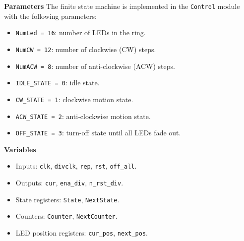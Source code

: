 \noindent\textbf{Parameters}
The finite state machine is implemented in the \texttt{Control} module with the following parameters:
\begin{itemize}
	\item \texttt{NumLed = 16}: number of LEDs in the ring.
	\item \texttt{NumCW = 12}: number of clockwise (CW) steps.
	\item \texttt{NumACW = 8}: number of anti-clockwise (ACW) steps.
	\item \texttt{IDLE\_STATE = 0}: idle state.
	\item \texttt{CW\_STATE = 1}: clockwise motion state.
	\item \texttt{ACW\_STATE = 2}: anti-clockwise motion state.
	\item \texttt{OFF\_STATE = 3}: turn-off state until all LEDs fade out.
\end{itemize}

\noindent\textbf{Variables}
\begin{itemize}
	\item Inputs: \texttt{clk}, \texttt{divclk}, \texttt{rep}, \texttt{rst}, \texttt{off\_all}.
	\item Outputs: \texttt{cur}, \texttt{ena\_div}, \texttt{n\_rst\_div}.
	\item State registers: \texttt{State}, \texttt{NextState}.
	\item Counters: \texttt{Counter}, \texttt{NextCounter}.
	\item LED position registers: \texttt{cur\_pos}, \texttt{next\_pos}.
\end{itemize}



